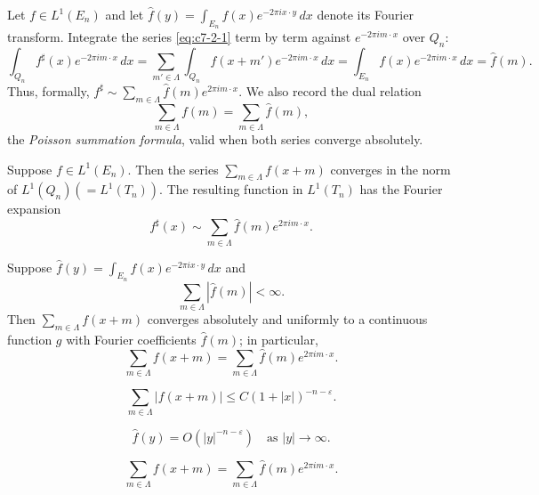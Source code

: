 Let $f \in L^1(E_n)$ and let $\hat{f}(y) = \int_{E_n} f(x) e^{-2\pi i x \cdot y}\,dx$ denote its Fourier transform. Integrate the series \eqref{eq:c7-2-1} term by term against $e^{-2\pi i m \cdot x}$ over $Q_n$:
\begin{equation}\label{eq:c7-2-2}
\int_{Q_n} f^\sharp(x) e^{-2\pi i m \cdot x}\,dx = \sum_{m' \in \Lambda} \int_{Q_n} f(x + m') e^{-2\pi i m \cdot x}\,dx = \int_{E_n} f(x) e^{-2\pi i m \cdot x}\,dx = \hat{f}(m).
\end{equation}
Thus, formally, $f^\sharp \sim \sum_{m \in \Lambda} \hat{f}(m) e^{2\pi i m \cdot x}$. We also record the dual relation
\begin{equation}\label{eq:c7-2-3}
\sum_{m \in \Lambda} f(m) = \sum_{m \in \Lambda} \hat{f}(m),
\end{equation}
the \emph{Poisson summation formula}, valid when both series converge absolutely.

\begin{theorem}\label{thm:c7-2-4}
Suppose $f \in L^1(E_n)$. Then the series $\sum_{m \in \Lambda} f(x + m)$ converges in the norm of $L^1(Q_n)(= L^1(T_n))$. The resulting function in $L^1(T_n)$ has the Fourier expansion
\begin{equation}\label{eq:c7-2-5}
f^\sharp(x) \sim \sum_{m \in \Lambda} \hat{f}(m) e^{2\pi i m \cdot x}.
\end{equation}
\end{theorem}

\begin{corollary}\label{cor:c7-2-6}
Suppose $\hat{f}(y) = \int_{E_n} f(x) e^{-2\pi i x \cdot y}\,dx$ and
\[
\sum_{m \in \Lambda} |\hat{f}(m)| < \infty.
\]
Then $\sum_{m \in \Lambda} f(x + m)$ converges absolutely and uniformly to a continuous function $g$ with Fourier coefficients $\hat{f}(m)$; in particular,
\[
\sum_{m \in \Lambda} f(x + m) = \sum_{m \in \Lambda} \hat{f}(m) e^{2\pi i m \cdot x}.
\]
\end{corollary}

\begin{equation}\label{eq:c7-2-7}
\sum_{m \in \Lambda} |f(x + m)| \leq C (1 + |x|)^{-n - \varepsilon}.
\end{equation}

\begin{equation}\label{eq:c7-2-8}
\hat{f}(y) = O(|y|^{-n - \varepsilon}) \quad \text{as } |y| \to \infty.
\end{equation}

\begin{equation}\label{eq:c7-2-9}
\sum_{m \in \Lambda} f(x + m) = \sum_{m \in \Lambda} \hat{f}(m) e^{2\pi i m \cdot x}.
\end{equation}

